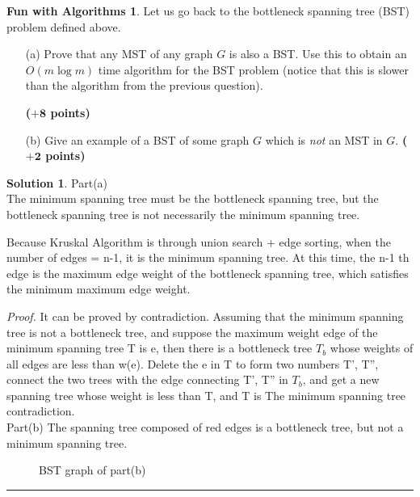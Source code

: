 \documentclass{article}
\theoremstyle{definition}
\newtheorem*{fun}{Fun with Algorithms}
\def\fline{\rule{0.75\linewidth}{0.5pt}}
\newcommand{\finishline}{\begin{center}\fline\end{center}}
\newtheorem*{solution*}{Solution}
\newenvironment{solution}{\begin{solution*}}{{\finishline} \end{solution*}}
\newcommand{\grade}[1]{\hfill{\textbf{($\mathbf{#1}$ points)}}}
\begin{document}
\begin{fun}
	Let us go back to the bottleneck spanning tree (BST) problem defined above. 
	\begin{enumerate}
		\item[(a)] Prove that any MST of any graph $G$ is also a BST. Use this to obtain an $O(m\log{m})$ time algorithm for the BST problem (notice that this is  slower than the algorithm from the previous question). 
		
		\grade{+8}
		\item[(b)] Give an example of a BST of some graph $G$ which is \emph{not} an MST in $G$. \grade{+2}
	\end{enumerate}
	
\begin{solution}

	 Part(a) \\
	The minimum spanning tree must be the bottleneck spanning tree, but the bottleneck spanning tree is not necessarily the minimum spanning tree.
	
	Because Kruskal Algorithm is through union search + edge sorting, when the number of edges = n-1, it is the minimum spanning tree. At this time, the n-1 th edge is the maximum edge weight of the bottleneck spanning tree, which satisfies the minimum maximum edge weight.
	
 	\emph{Proof.} It can be proved by contradiction.
	Assuming that the minimum spanning tree is not a bottleneck tree, and suppose the maximum weight edge of the minimum spanning tree T is e, then there is a bottleneck tree $T_b$ whose weights of all edges are less than w(e). Delete the e in T to form two numbers T', T'', connect the two trees with the edge connecting T', T'' in $T_b$, and get a new spanning tree whose weight is less than T, and T is The minimum spanning tree contradiction. \\
	
	Part(b) 
	The spanning tree composed of red edges is a bottleneck tree, but not a minimum spanning tree.
	\begin{figure}[h!]
			\centering
		\caption{BST graph of part(b)} 
	\end{figure}
	
\end{solution}
	
 \end{fun}
\end{document}
